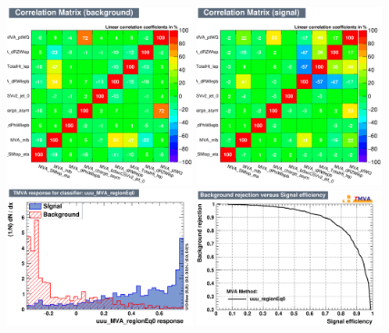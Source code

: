 \begin{figure}[htbp]
	\includegraphics[width=0.48\textwidth]{6_Search/Figures/MVAtechnics/singletopzut/uuu/CorrelationMatrixB.png}
	\includegraphics[width=0.48\textwidth]{6_Search/Figures/MVAtechnics/singletopzut/uuu/CorrelationMatrixS.png}
	\includegraphics[width=0.48\textwidth]{6_Search/Figures/MVAtechnics/singletopzut/uuu/mva_uuu_MVA_regionEq0.png}
	\includegraphics[width=0.48\textwidth]{6_Search/Figures/MVAtechnics/singletopzut/uuu/rejBvsS.png}

\end{figure}
